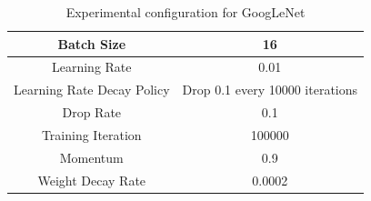 \begin{table}
	\centering
	\begin{tabular}{|c|c|}
		\hline
		Batch Size & 16 \\ \hline
		Learning Rate& 0.01\\ \hline
		Learning Rate Decay Policy& Drop 0.1 every 10000 iterations\\\hline
		Drop Rate & 0.1\\\hline
		Training Iteration& 100000\\\hline
		Momentum & 0.9\\\hline
		Weight Decay Rate& 0.0002\\\hline
		\end{tabular}
		\caption{Experimental configuration for GoogLeNet}\label{tab:config}
	\end{table}
